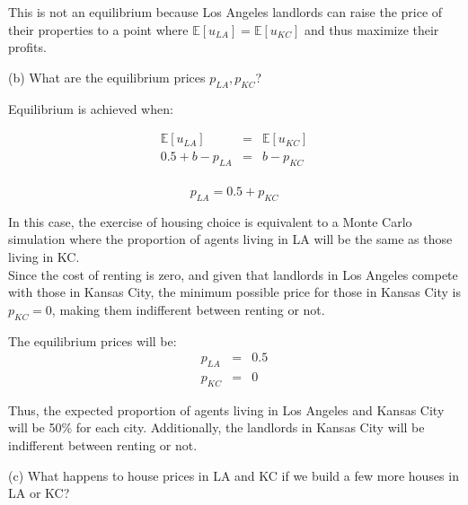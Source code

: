 This is not an equilibrium because Los Angeles landlords can raise the price of their properties to a point where \(\mathbb{E}[u_{LA}] = \mathbb{E}[u_{KC}]\) and thus maximize their profits.

\begin{tcolorbox}
    (b) What are the equilibrium prices \( p_{LA}, p_{KC} \)?
\end{tcolorbox}

Equilibrium is achieved when:

\begin{eqnarray*}
    \mathbb{E}[u_{LA}] &=& \mathbb{E}[u_{KC}]\\
    0.5 + b - p_{LA} &=& b - p_{KC}\\
\end{eqnarray*}

\begin{equation}
    p_{LA} = 0.5 + p_{KC}
    \label{eq:equilibrium}
\end{equation}

In this case, the exercise of housing choice is equivalent to a Monte Carlo simulation where the proportion of agents living in LA will be the same as those living in KC.\\

Since the cost of renting is zero, and given that landlords in Los Angeles compete with those in Kansas City, the minimum possible price for those in Kansas City is \( p_{KC} = 0 \), making them indifferent between renting or not.


\begin{myanswerbox}
    The equilibrium prices will be:
    \begin{eqnarray*}
        p_{LA} &=& 0.5\\
        p_{KC} &=& 0
    \end{eqnarray*}

    Thus, the expected proportion of agents living in Los Angeles and Kansas City will be 50\% for each city. Additionally, the landlords in Kansas City will be indifferent between renting or not.
\end{myanswerbox}
\begin{tcolorbox}
    (c) What happens to house prices in LA and KC if we build a few more houses in LA or KC?
\end{tcolorbox}

